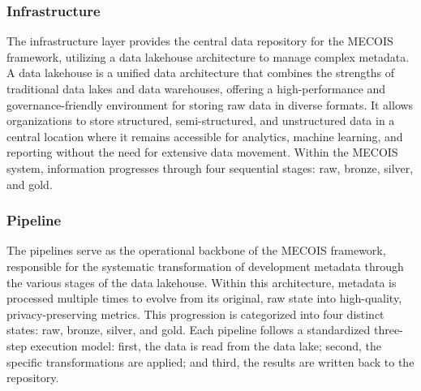 \subsubsection{Infrastructure}
\label{subsubsec:infrastructure}

The infrastructure layer provides the central data repository for the MECOIS framework, utilizing a data lakehouse architecture to manage complex metadata. A data lakehouse is a unified data architecture that combines the strengths of traditional data lakes and data warehouses, offering a high-performance and governance-friendly environment for storing raw data in diverse formats. It allows organizations to store structured, semi-structured, and unstructured data in a central location where it remains accessible for analytics, machine learning, and reporting without the need for extensive data movement. Within the MECOIS system, information progresses through four sequential stages: raw, bronze, silver, and gold.
\autocite{aws_datalakehouse_2026}

\subsubsection{Pipeline}
\label{subsubsec:pipeline}

The pipelines serve as the operational backbone of the MECOIS framework, responsible for the systematic transformation of development metadata through the various stages of the data lakehouse. Within this architecture, metadata is processed multiple times to evolve from its original, raw state into high-quality, privacy-preserving metrics. This progression is categorized into four distinct states: raw, bronze, silver, and gold. Each pipeline follows a standardized three-step execution model: first, the data is read from the data lake; second, the specific transformations are applied; and third, the results are written back to the repository.


